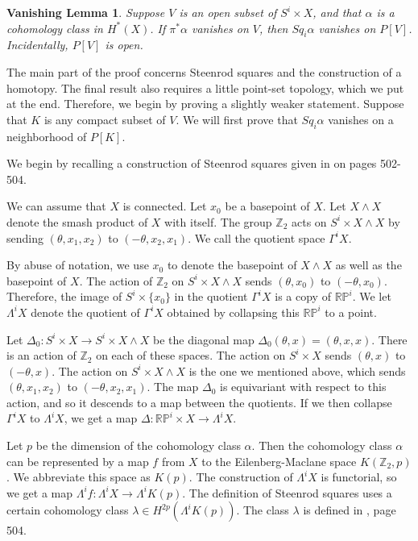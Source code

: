 \documentclass{amsart}
\newtheorem*{Theorem 1}{Theorem 1}
\newtheorem*{Theorem 2}{Theorem 2}
\newtheorem*{Theorem 1A}{Theorem 1A}
\newtheorem*{Theorem 2A}{Theorem 2A}
\newtheorem*{vanishing lemma}{Vanishing Lemma}
\numberwithin{equation}{section}
\begin{document}
\begin{vanishing lemma} Suppose $V$ is an open subset of $S^i \times X$, and
that $\alpha$ is a cohomology class in $H^*(X)$.
If $\pi^* \alpha$ vanishes on $V$, then
$Sq_i \alpha $ vanishes on $P[V]$.  Incidentally, $P[V]$ is open.
\end{vanishing lemma}

\proof The main part of the proof concerns Steenrod squares and
the construction of a homotopy.  The final result also requires
a little point-set topology, which we put at the end.  Therefore,
we begin by proving a slightly weaker statement.  Suppose that 
$K$ is any compact subset of $V$.  We will first prove that $Sq_i \alpha$
vanishes on a neighborhood of $P[K]$.

We begin by recalling a construction of Steenrod squares
given in \cite{H} on pages 502-504.

We can assume that $X$ is connected.  Let $x_0$ be a basepoint of
$X$.  Let $X \wedge X$ denote the smash product of $X$ with
itself.  The group $\mathbb{Z}_2$ acts on $S^i \times X \wedge X$
by sending $(\theta, x_1, x_2)$ to $(- \theta, x_2, x_1)$.  We
call the quotient space $\Gamma^i X$.

By abuse of notation, we use $x_0$ to denote the basepoint of $X
\wedge X$ as well as the basepoint of $X$.  The action of
$\mathbb{Z}_2$ on $S^i \times X \wedge X$
sends $(\theta, x_0)$ to $(-\theta, x_0)$.  Therefore, the image
of $S^i \times \{ x_0 \}$ in the quotient $\Gamma^i X$ is a copy
of $\mathbb{RP}^i$.  We let $\Lambda^i X$ denote the quotient of
$\Gamma^i X$ obtained by collapsing this $\mathbb{RP}^i$ to a
point.  

Let $\Delta_0: S^i \times X \rightarrow S^i \times X \wedge X$ be
the diagonal map $\Delta_0(\theta, x) = (\theta, x, x)$.  There
is an action of $\mathbb{Z}_2$ on each of these spaces.  The
action on $S^i \times X$ sends $(\theta, x)$ to $(-\theta, x)$. 
The action on $S^i \times X \wedge X$ is the one we mentioned
above, which sends $(\theta, x_1, x_2)$ to $(- \theta, x_2,
x_1)$.  The map $\Delta_0$ is equivariant with respect to this
action, and so it descends to a map between the quotients.  If we
then collapse $\Gamma^i X$ to $\Lambda^i X$, we get a map
$\Delta: \mathbb{RP}^i \times X \rightarrow \Lambda^i X$.

Let $p$ be the dimension of the cohomology class $\alpha$.
Then the cohomology class $\alpha$ can be represented by a map $f$
from $X$ to the Eilenberg-Maclane space $K(\mathbb{Z}_2, p)$.  We
abbreviate this space as $K(p)$.  The construction of $\Lambda^i
X$ is functorial, so we get a map $\Lambda^i f: \Lambda^i X
\rightarrow \Lambda^i K(p)$.  The definition of Steenrod squares
uses a certain cohomology class $\lambda \in H^{2p}(\Lambda^i
K(p))$.  The class $\lambda$ is defined in \cite{H}, page 504.
\end{document}
